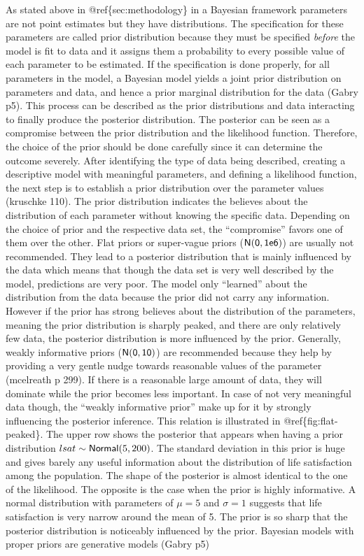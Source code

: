 \documentclass[a4, 12pt]{article}
\begin{document}
\label{subsec:priors}
As stated above in @ref\{sec:methodology\} in a Bayesian framework parameters are not point estimates but they have distributions. The specification for these parameters are called prior distribution because they must be specified \emph{before} the model is fit to data and it assigns them a probability to every possible value of each parameter to be estimated. If the specification is done properly, for all parameters in the model, a Bayesian model yields a joint prior distribution on parameters and data, and hence a prior marginal distribution for the data (Gabry p5). This process can be described as the prior distributions and data interacting to finally produce the posterior distribution. The posterior can be seen as a compromise between the prior distribution and the likelihood function. Therefore, the choice of the prior should be done carefully since it can determine the outcome severely. After identifying the type of data being described, creating a descriptive model with meaningful parameters, and defining a likelihood function, the next step is to establish a prior distribution over the parameter values (kruschke 110). The prior distribution indicates the believes about the distribution of each parameter without knowing the specific data. Depending on the choice of prior and the respective data set, the ``compromise'' favors one of them over the other. Flat priors or super-vague priors (\(\sf {N}(0,1e6)\)) are usually not recommended. They lead to a posterior distribution that is mainly influenced by the data which means that though the data set is very well described by the model, predictions are very poor. The model only ``learned'' about the distribution from the data because the prior did not carry any information. However if the prior has strong believes about the distribution of the parameters, meaning the prior distribution is sharply peaked, and there are only relatively few data, the posterior distribution is more influenced by the prior. Generally, weakly informative priors (\(\sf{N}(0,10)\)) are recommended because they help by providing a very gentle nudge towards reasonable values of the parameter (mcelreath p 299). If there is a reasonable large amount of data, they will dominate while the prior becomes less important. In case of not very meaningful data though, the ``weakly informative prior'' make up for it by strongly influencing the posterior inference. This relation is illustrated in @ref\{fig:flat-peaked\}. The upper row shows the posterior that appears when having a prior distribution \(lsat \sim {\sf Normal}(5, 200)\). The standard deviation in this prior is huge and gives barely any useful information about the distribution of life satisfaction among the population. The shape of the posterior is almost identical to the one of the likelihood. The opposite is the case when the prior is highly informative. A normal distribution with parameters of \(\mu = 5\) and \(\sigma = 1\) suggests that life satisfaction is very narrow around the mean of 5. The prior is so sharp that the posterior distribution is noticeably influenced by the prior. Bayesian models with proper priors are generative models (Gabry p5)
\end{document}
